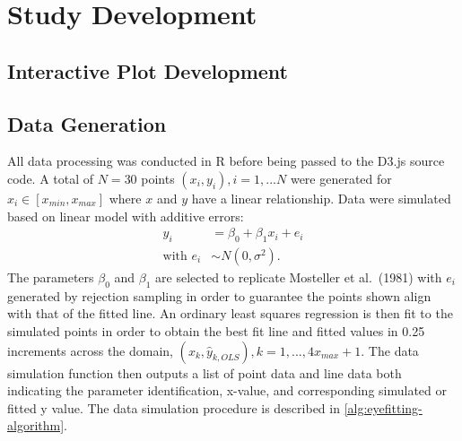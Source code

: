 \documentclass[12pt]{article}
\begin{document}
\hypertarget{study-development}{%
\section{Study Development}\label{study-development}}

\hypertarget{interactive-plot-development}{%
\subsection{Interactive Plot
Development}\label{interactive-plot-development}}

\hypertarget{data-generation}{%
\subsection{Data Generation}\label{data-generation}}

All data processing was conducted in R before being passed to the D3.js
source code. A total of \(N = 30\) points \((x_i, y_i), i = 1,...N\)
were generated for \(x_i \in [x_{min}, x_{max}]\) where \(x\) and \(y\)
have a linear relationship. Data were simulated based on linear model
with additive errors: \begin{align}
y_i & = \beta_0 + \beta_1 x_i + e_i \\
\text{with } e_i & \sim N(0, \sigma^2). \nonumber
\end{align} The parameters \(\beta_0\) and \(\beta_1\) are selected to
replicate Mosteller et al.~(1981) with \(e_i\) generated by rejection
sampling in order to guarantee the points shown align with that of the
fitted line. An ordinary least squares regression is then fit to the
simulated points in order to obtain the best fit line and fitted values
in 0.25 increments across the domain,
\((x_k, \hat y_{k,OLS}), k = 1, ..., 4 x_{max} +1\). The data simulation
function then outputs a list of point data and line data both indicating
the parameter identification, x-value, and corresponding simulated or
fitted y value. The data simulation procedure is described in
\cref{alg:eyefitting-algorithm}.
\end{document}
